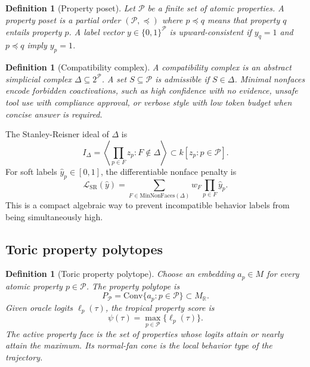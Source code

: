 \documentclass[11pt]{article}
\newtheorem{definition}[theorem]{Definition}
\newcommand{\RR}{\mathbb{R}}
\newcommand{\calP}{\mathcal{P}}
\newcommand{\loss}{\mathcal{L}}
\numberwithin{equation}{section}
\begin{document}
\begin{definition}[Property poset]
Let $\calP$ be a finite set of atomic properties. A property poset is a partial order $(\calP,\preceq)$ where $p\preceq q$ means that property $q$ entails property $p$. A label vector $y\in\{0,1\}^{\calP}$ is upward-consistent if $y_q=1$ and $p\preceq q$ imply $y_p=1$.
\end{definition}

\begin{definition}[Compatibility complex]
A compatibility complex is an abstract simplicial complex $\Delta\subseteq 2^{\calP}$. A set $S\subseteq\calP$ is admissible if $S\in\Delta$. Minimal nonfaces encode forbidden coactivations, such as high confidence with no evidence, unsafe tool use with compliance approval, or verbose style with low token budget when concise answer is required.
\end{definition}

The Stanley-Reisner ideal of $\Delta$ is
\begin{equation}
I_\Delta=\left\langle \prod_{p\in F} z_p : F\notin\Delta\right\rangle \subset k[z_p:p\in\calP].
\end{equation}
For soft labels $\hat y_p\in[0,1]$, the differentiable nonface penalty is
\begin{equation}
\loss_{\mathrm{SR}}(\hat y)=\sum_{F\in \mathrm{MinNonFaces}(\Delta)} w_F\prod_{p\in F}\hat y_p.
\end{equation}
This is a compact algebraic way to prevent incompatible behavior labels from being simultaneously high.

\subsection{Toric property polytopes}
\begin{definition}[Toric property polytope]
Choose an embedding $a_p\in M$ for every atomic property $p\in\calP$. The property polytope is
\begin{equation}
P_{\calP}=\mathrm{Conv}\{a_p:p\in\calP\}\subset M_\RR.
\end{equation}
Given oracle logits $\ell_p(\tau)$, the tropical property score is
\begin{equation}
\psi(\tau)=\max_{p\in\calP}\{\ell_p(\tau)\}.
\end{equation}
The active property face is the set of properties whose logits attain or nearly attain the maximum. Its normal-fan cone is the local behavior type of the trajectory.
\end{definition}
\end{document}
